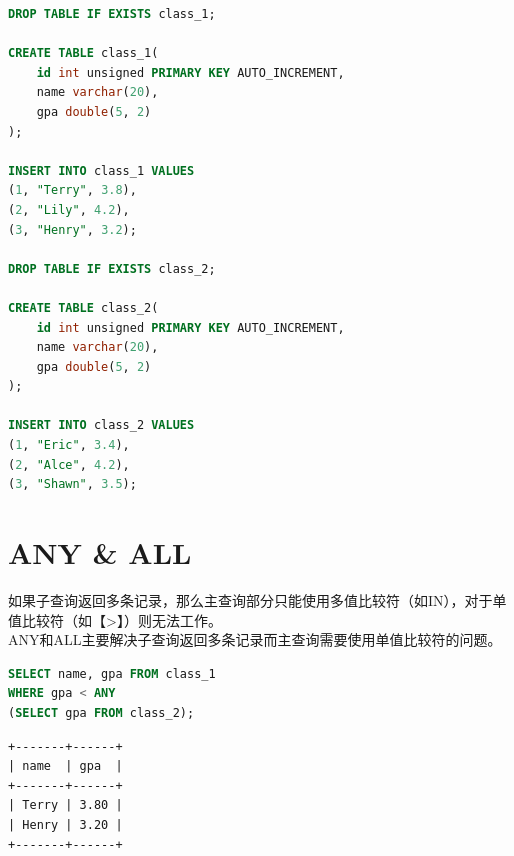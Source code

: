 \documentclass[12pt, openany, oneside]{book}
\begin{document}

\begin{lstlisting}[language=SQL]
DROP TABLE IF EXISTS class_1;

CREATE TABLE class_1(
    id int unsigned PRIMARY KEY AUTO_INCREMENT,
    name varchar(20),
    gpa double(5, 2)
);

INSERT INTO class_1 VALUES
(1, "Terry", 3.8),
(2, "Lily", 4.2),
(3, "Henry", 3.2);

DROP TABLE IF EXISTS class_2;

CREATE TABLE class_2(
    id int unsigned PRIMARY KEY AUTO_INCREMENT,
    name varchar(20),
    gpa double(5, 2)
);

INSERT INTO class_2 VALUES
(1, "Eric", 3.4),
(2, "Alce", 4.2),
(3, "Shawn", 3.5);
\end{lstlisting}

\vspace{0.5cm}

\section{ANY \& ALL}

如果子查询返回多条记录，那么主查询部分只能使用多值比较符（如IN），对于单值比较符（如【>】）则无法工作。\\

ANY和ALL主要解决子查询返回多条记录而主查询需要使用单值比较符的问题。

\begin{table}[H]
	\centering
	\caption{ANY \& ALL}
\end{table}


\begin{lstlisting}[language=SQL]
SELECT name, gpa FROM class_1
WHERE gpa < ANY
(SELECT gpa FROM class_2);
\end{lstlisting}

\begin{tcolorbox}
	\begin{verbatim}
+-------+------+
| name  | gpa  |
+-------+------+
| Terry | 3.80 |
| Henry | 3.20 |
+-------+------+
	\end{verbatim}
\end{tcolorbox}
\end{document}

